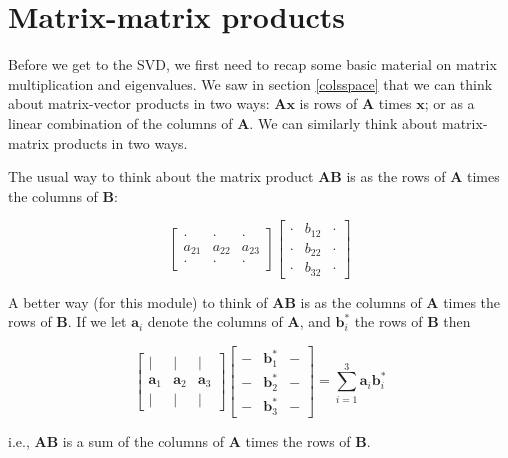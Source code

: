 \documentclass[]{book}
\theoremstyle{definition}
\theoremstyle{definition}
\theoremstyle{definition}
\theoremstyle{remark}
\begin{document}
\hypertarget{matrix-matrix}{%
\section{Matrix-matrix products}\label{matrix-matrix}}

Before we get to the SVD, we first need to recap some basic material on matrix multiplication and eigenvalues.
We saw in section \ref{colsspace} that we can think about matrix-vector products in two ways: \(\boldsymbol A\boldsymbol x\) is rows of \(\boldsymbol A\) times \(\boldsymbol x\); or as a linear combination of the columns of \(\boldsymbol A\). We can similarly think about matrix-matrix products in two ways.

The usual way to think about the matrix product \(\boldsymbol A\boldsymbol B\) is as the rows of \(\boldsymbol A\) times the columns of \(\boldsymbol B\):

\[\left[ \begin{array}{ccc}
\cdot & \cdot &\cdot\\
a_{21}&a_{22}&a_{23}\\
\cdot & \cdot &\cdot
\end{array}
\right]\left[\begin{array}{ccc}
\cdot & b_{12} &\cdot\\
\cdot&b_{22}&\cdot\\
\cdot & b_{32} &\cdot
\end{array}
\right]\]

A better way (for this module) to think of \(\boldsymbol A\boldsymbol B\) is as the columns of \(\boldsymbol A\) times the rows of \(\boldsymbol B\). If we let \(\boldsymbol a_i\) denote the columns of \(\boldsymbol A\), and \(\boldsymbol b^*_i\) the rows of \(\boldsymbol B\) then

\[\left[ \begin{array}{ccc}
| & | &|\\
\boldsymbol a_{1}&\boldsymbol a_{2}&\boldsymbol a_{3}\\
| & | &|
\end{array}
\right]\left[\begin{array}{ccc}
- & \boldsymbol b_{1}^* &-\\
-&\boldsymbol b_{2}^*&-\\
- & \boldsymbol b_{3}^* &-
\end{array}
\right]=\sum_{i=1}^3\boldsymbol a_i \boldsymbol b_i^*\]

i.e., \(\boldsymbol A\boldsymbol B\) is a sum of the columns of \(\boldsymbol A\) times the rows of \(\boldsymbol B\).
\end{document}
